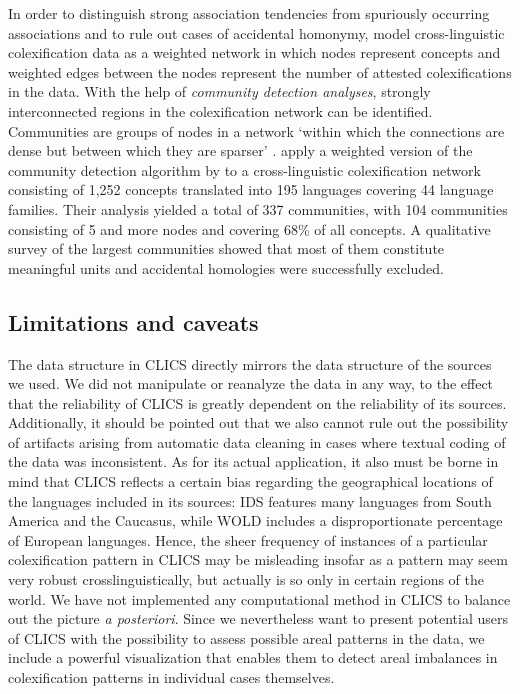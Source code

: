 In order to distinguish strong association tendencies from spuriously occurring associations and to
rule out cases of accidental homonymy,  model cross-linguistic colexification
data as a weighted network in which nodes represent concepts and weighted edges between the nodes
represent the number of attested colexifications in the data.  With the help of \emph{community
detection analyses}, strongly interconnected regions in the colexification network can be
identified. 
Communities are groups of nodes in a network
`within which the connections are dense but between which they are sparser' \cite{Newman2004}.
 apply a weighted version of the community detection algorithm by
 to a cross-linguistic colexification network consisting of 1,252 concepts
translated into 195 languages covering 44 language families. Their analysis yielded a total of 337
communities, with 104 communities consisting of 5 and more nodes and covering 68\% of all concepts.
A qualitative survey of the largest communities showed that most of them constitute meaningful
units and accidental homologies were successfully excluded.

\subsection{Limitations and caveats} \label{caveats}

The data structure in CLICS directly mirrors the data structure of the sources we used. We did not manipulate or
reanalyze the data in any way, to the effect that the reliability of CLICS is greatly dependent on
the reliability of its sources. Additionally, it should be pointed out that we also cannot rule out the
possibility of artifacts arising from automatic data cleaning in cases where textual coding of the
data was inconsistent. As for its actual application, it also must be borne in mind that CLICS
reflects a certain bias regarding the geographical locations of the languages included in its
sources: IDS features many languages from South America and the Caucasus, while WOLD includes a
disproportionate percentage of European languages. Hence, the sheer frequency of instances of a
particular colexification pattern in CLICS may be misleading insofar as a pattern may seem very robust
crosslinguistically, but actually is so only in certain regions of the world. We have not
implemented any computational method in CLICS to balance out the picture \emph{a posteriori}. Since
we nevertheless want to present potential users of CLICS with the possibility to assess possible
areal patterns in the data, we include a powerful visualization that enables them to detect areal
imbalances in colexification patterns in individual cases themselves.


